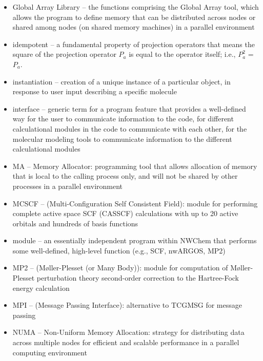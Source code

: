 \begin{itemize}
\item Global Array Library -- the functions comprising the Global
Array tool, which allows the program to define memory that can be
distributed across nodes or shared among nodes (on shared memory machines)
in a parallel environment

\item idempotent -- a fundamental property of projection operators that means
the square of the projection operator $P_{a}$ is 
equal to the operator itself; i.e., $P_{a}^2$ = $P_{a}$.


\item instantiation -- creation of a unique instance of a particular object,
in response to user input describing a specific molecule 

\item interface -- generic term for a program feature that provides a
well-defined
way for the user to communicate information to the code, for different 
calculational modules in the code to communicate with each other, for
the molecular modeling tools to communicate information to the 
different calculational modules

\item MA -- Memory Allocator: programming tool that allows allocation of
memory that is local to the calling process only, and will not be shared
by other processes in a parallel environment

\item MCSCF -- (Multi-Configuration Self Consistent Field): module for
performing complete active space SCF (CASSCF) calculations with up to
20 active orbitals and hundreds of basis functions

\item module -- an essentially independent program within NWChem that performs
some well-defined, high-level function (e.g., SCF, nwARGOS, MP2)

\item MP2 -- (M{\o}ller-Plesset (or Many Body)): module for computation of 
M{\o}ller-Plesset perturbation theory
second-order correction to the Hartree-Fock energy calculation

\item MPI -- (Message Passing Interface): alternative to TCGMSG for message passing

\item NUMA -- Non-Uniform Memory Allocation: strategy for distributing data
across multiple nodes for efficient and scalable performance in a parallel 
computing environment


\end{itemize}
